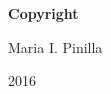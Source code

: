 
\newpage

\thispagestyle{empty}

\vspace*{0.9cm}

\begin{center}

{\bf \Huge Copyright}

\vspace{1cm}


   \Large Maria I. Pinilla\\

   \vspace{0.5cm}


   2016\\

   \vspace{0.5cm}

\end{center}
